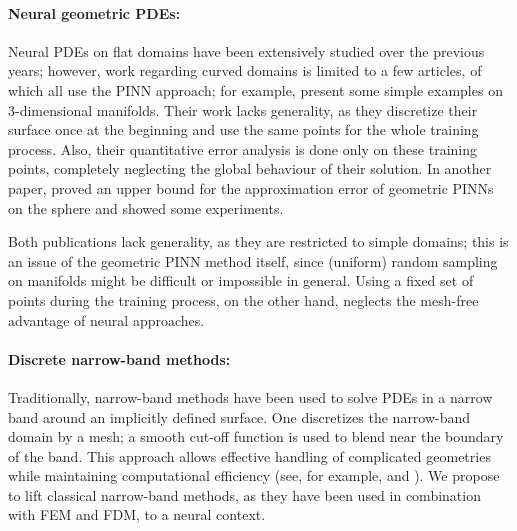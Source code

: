 \documentclass[12pt,openany]{book}
\theoremstyle{plainnormal}
\theoremstyle{remark}
\begin{document}
\paragraph{Neural geometric PDEs:}
Neural PDEs on flat domains have been extensively studied over the previous years; however, work regarding curved domains is limited to a few articles, of which all use the PINN approach; for example, \cite{tangfu} present some simple examples on 3-dimensional manifolds. Their work lacks generality, as they discretize their surface once at the beginning and use the same points for the whole training process. Also, their quantitative error analysis is done only on these training points, completely neglecting the global behaviour of their solution. In another paper, \cite{lei2024solvingpdesspheresphysicsinformed} proved an upper bound for the approximation error of geometric PINNs on the sphere and showed some experiments.\par
Both publications lack generality, as they are restricted to simple domains; this is an issue of the geometric PINN method itself, since (uniform) random sampling on manifolds might be difficult or impossible in general. Using a fixed set of points during the training process, on the other hand, neglects the mesh-free advantage of neural approaches. 
\paragraph{Discrete narrow-band methods:}
Traditionally, narrow-band methods have been used to solve PDEs in a narrow band around an implicitly defined surface. One discretizes the narrow-band domain by a mesh; a smooth cut-off function is used to blend near the boundary of the band. This approach allows effective handling of complicated geometries while maintaining computational efficiency (see, for example, \cite{deckelnick} and \cite{neRU}). We propose to lift classical narrow-band methods, as they have been used in combination with FEM and FDM, to a neural context. 
\end{document}
